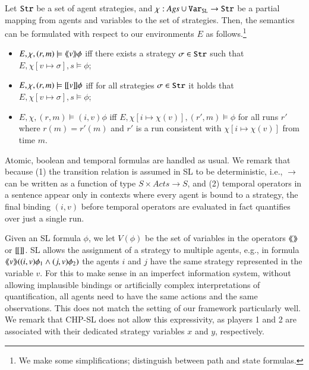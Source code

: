 \documentclass[a4wide]{article}
\newcommand{\trans}{\rightarrow}
\theoremstyle{examplesty}
\newcommand{\strat}{\sigma}
\newcommand{\Ags}{\mathit{Ags}}
\newcommand{\atlop}[1]{\langle\hspace{-2pt}\langle #1 \rangle \hspace{-2pt}\rangle }
\newcommand{\atluop}[1]{[\hspace{-1pt}[ #1]\hspace{-1pt}]}
\newcommand{\Acts}{\mathit{Acts}}
\begin{document}
Let ${\tt Str}$ be a set of agent strategies, 
and $\chi:\Ags\cup \slvar\rightarrow \str$ be a 
partial 
mapping from agents and variables to the set of strategies. 
Then, the semantics 
can be formulated with respect to our environments $E$
as follows.\footnote{We make some simplifications; \cite{MogaveroMV10}  distinguish between path and state formulas.} 
\begin{itemize}
\item $E,\chi,(r,m)\models \atlop{v}\phi $ iff there exists a strategy $\strat \in \str$ such that $E,\chi[v\mapsto \strat], s\models \phi$; 
\item $E,\chi,(r,m)\models \atluop{v}\phi $ iff for all strategies $\strat \in \str$ it holds that $E,\chi[v\mapsto \strat], s\models \phi$; 
\item $E,\chi,(r,m) \models (i,v)\phi $ iff $E,\chi[i\mapsto \chi(v)],(r',m)\models \phi$ for all runs $r'$ where $r(m)=r'(m)$ and 
$r'$ is a run consistent with $\chi[i\mapsto \chi(v)]$ from time $m$. 
\end{itemize}
Atomic, boolean and temporal formulas are handled as usual. We remark that because (1) the transition relation is assumed in SL to be deterministic, 
i.e., $\trans$ can be written as a function of type $S \times \Acts \rightarrow S$,
and (2)  temporal operators in a sentence appear only in contexts where every agent is bound to a strategy,  the final binding $(i,v)$ before temporal 
operators are evaluated in fact quantifies over just a single run.  	

Given an SL formula $\phi$, we let $V(\phi)$ be the set of variables in the operators $\atlop{}$ or $\atluop{}$. 
 SL allows the assignment of a strategy to multiple agents, e.g., in formula $\atlop{v}((i,v)\phi_1\land (j,v)\phi_2)$ the agents $i$ and $j$ have the same strategy represented in the variable $v$. For this 
to make sense 
in an imperfect information system, 
without allowing implausible bindings or artificially complex interpretations of quantification, 
all agents need to have the same actions and
the same observations. This does not match the setting of our framework particularly well.  We remark that CHP-SL does not allow this expressivity, as players 1 and 2 are associated with their dedicated strategy variables $x$ and $y$, respectively. 
\end{document}
